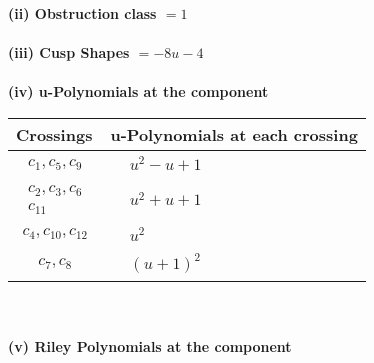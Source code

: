 \documentclass[1p]{elsarticle_modified}
\theoremstyle{definition}
\begin{document}
\flushleft \textbf{(ii) Obstruction class $= 1$}\\~\\
\flushleft \textbf{(iii) Cusp Shapes $= -8 u-4$}\\~\\
\newpage\renewcommand{\arraystretch}{1}
\flushleft \textbf{(iv) u-Polynomials at the component}\newline \\
\begin{tabular}{m{50pt}|m{274pt}}
Crossings & \hspace{64pt}u-Polynomials at each crossing \\
\hline $$\begin{aligned}c_{1},c_{5},c_{9}\end{aligned}$$&$\begin{aligned}
&u^2- u+1
\end{aligned}$\\
\hline $$\begin{aligned}c_{2},c_{3},c_{6}\\c_{11}\end{aligned}$$&$\begin{aligned}
&u^2+u+1
\end{aligned}$\\
\hline $$\begin{aligned}c_{4},c_{10},c_{12}\end{aligned}$$&$\begin{aligned}
&u^2
\end{aligned}$\\
\hline $$\begin{aligned}c_{7},c_{8}\end{aligned}$$&$\begin{aligned}
&(u+1)^2
\end{aligned}$\\
\hline
\end{tabular}\\~\\
\newpage\renewcommand{\arraystretch}{1}
\flushleft \textbf{(v) Riley Polynomials at the component}\newline \\
\end{document}
